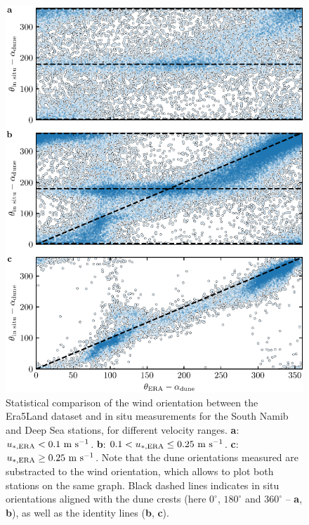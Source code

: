 \begin{figure}
  \centering
  \includegraphics[scale=1]{Figures/Figure7_supp.pdf}
  \caption{Statistical comparison of the wind orientation between the Era5Land dataset and in situ measurements for the South Namib and Deep Sea stations, for different velocity ranges. \textbf{a}: $u_{*, \textup{\textup{ERA}}} < 0.1~\textup{m}~\textup{s}^{-1}$. \textbf{b}: $0.1 < u_{*, \textup{\textup{ERA}}} \leq 0.25~\textup{m}~\textup{s}^{-1}$. \textbf{c}: $u_{*, \textup{\textup{ERA}}} \geq 0.25~\textup{m}~\textup{s}^{-1}$. Note that the dune orientations measured are substracted to the wind orientation, which allows to plot both stations on the same graph. Black dashed lines indicates in situ orientations aligned with the dune crests (here $0^\circ$, $180^\circ$ and $360^\circ$ -- \textbf{a}, \textbf{b}), as well as the identity lines (\textbf{b}, \textbf{c}).}
  \label{Fig7_supp}
\end{figure}

